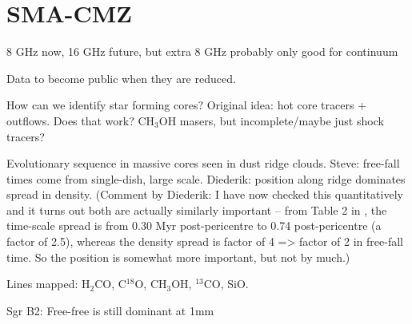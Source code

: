 \section{SMA-CMZ}
8 GHz now, 16 GHz future, but extra 8 GHz probably only good for continuum

Data to become public when they are reduced.

How can we identify star forming cores?  Original idea: hot core tracers + outflows.  Does that work? CH$_3$OH masers, but incomplete/maybe just shock tracers?

Evolutionary sequence in massive cores seen in dust ridge clouds.  Steve: free-fall times come from single-dish, large scale.  Diederik: position along ridge dominates spread in density. (Comment by Diederik: I have now checked this quantitatively and it turns out both are actually similarly important -- from Table 2 in \citet{Kruijssen2015a}, the time-scale spread is from 0.30 Myr post-pericentre to 0.74 post-pericentre (a factor of 2.5), whereas the density spread is factor of 4 => factor of 2 in free-fall time. So the position is somewhat more important, but not by much.)

Lines mapped: H$_2$CO, C$^{18}$O, CH$_3$OH, $^{13}$CO, SiO.

Sgr B2: Free-free is still dominant at 1mm